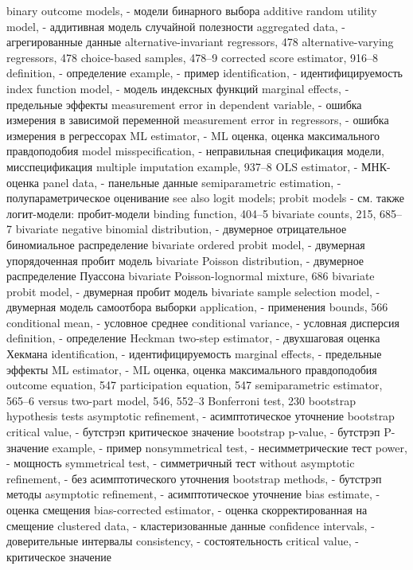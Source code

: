 binary outcome models, - модели бинарного выбора
additive random utility model, - аддитивная модель случайной полезности
aggregated data, - агрегированные данные
alternative-invariant regressors, 478
alternative-varying regressors, 478 choice-based samples, 478–9 
corrected score estimator, 916–8 
definition, - определение
example, - пример
identification, - идентифицируемость
index function model, - модель индексных функций
marginal effects, - предельные эффекты
measurement error in dependent variable, - ошибка измерения в зависимой переменной
measurement error in regressors, - ошибка измерения в регрессорах
ML estimator, - ML оценка, оценка максимального правдоподобия
model misspecification, - неправильная спецификация модели, мисспецификация
multiple imputation example, 937–8
OLS estimator, - МНК-оценка
panel data, - панельные данные
semiparametric estimation, - полупараметрическое оценивание
see also logit models; probit models - см. также логит-модели: пробит-модели
binding function, 404–5
bivariate counts, 215, 685–7
bivariate negative binomial distribution, - двумерное отрицательное биномиальное распределение 
bivariate ordered probit model, - двумерная упорядоченная пробит модель
bivariate Poisson distribution, - двумерное распределение Пуассона
bivariate Poisson-lognormal mixture, 686 
bivariate probit model, - двумерная пробит модель
bivariate sample selection model, - двумерная модель самоотбора выборки
application, - применения
bounds, 566
conditional mean, - условное среднее
conditional variance, - условная дисперсия
definition, - определение
Heckman two-step estimator, - двухшаговая оценка Хекмана 
identification, - идентифицируемость
marginal effects, - предельные эффекты
ML estimator, - ML оценка, оценка максимального правдоподобия
outcome equation, 547 participation equation, 547 semiparametric estimator, 565–6 versus two-part model, 546, 552–3
Bonferroni test, 230 bootstrap hypothesis tests
asymptotic refinement, - асимптотическое уточнение
bootstrap critical value, - бутстрэп критическое значение
bootstrap p-value, - бутстрэп P-значение
example, - пример
nonsymmetrical test, - несимметрические тест
power, - мощность
symmetrical test, - симметричный тест
without asymptotic refinement, - без асимптотического уточнения
bootstrap methods, - бутстрэп методы
asymptotic refinement, - асимптотическое уточнение
bias estimate, - оценка смещения
bias-corrected estimator, - оценка скорректированная на смещение 
clustered data, - кластеризованные данные
confidence intervals, - доверительные интервалы
consistency, - состоятельность
critical value, - критическое значение
